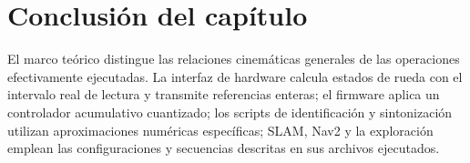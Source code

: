 \section*{Conclusión del capítulo}

El marco teórico distingue las relaciones cinemáticas generales de las operaciones efectivamente ejecutadas. La interfaz de hardware calcula estados de rueda con el intervalo real de lectura y transmite referencias enteras; el firmware aplica un controlador acumulativo cuantizado; los scripts de identificación y sintonización utilizan aproximaciones numéricas específicas; SLAM, Nav2 y la exploración emplean las configuraciones y secuencias descritas en sus archivos ejecutados.